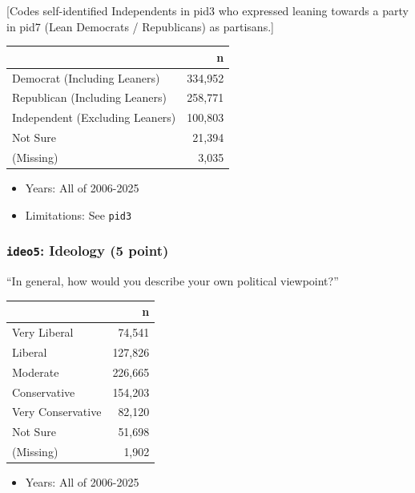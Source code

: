 \documentclass[10pt,article,oneside]{memoir}
\begin{document}
{[}Codes self-identified Independents in pid3 who expressed leaning
towards a party in pid7 (Lean Democrats / Republicans) as partisans.{]}

\begin{table}[H]
\centering
\begin{tabular}[t]{lr}
\toprule
 & n\\
\midrule
Democrat (Including Leaners) & 334,952\\
Republican (Including Leaners) & 258,771\\
Independent (Excluding Leaners) & 100,803\\
Not Sure & 21,394\\
(Missing) & 3,035\\
\bottomrule
\end{tabular}
\end{table}

\begin{itemize}
\tightlist
\item
  Years: All of 2006-2025
\item
  Limitations: See \texttt{pid3}
\end{itemize}

\subsubsection{\texorpdfstring{\texttt{ideo5}: Ideology (5
point)}{ideo5: Ideology (5 point)}}\label{ideo5-ideology-5-point}

``In general, how would you describe your own political viewpoint?''

\begin{table}[H]
\centering
\begin{tabular}[t]{lr}
\toprule
 & n\\
\midrule
Very Liberal & 74,541\\
Liberal & 127,826\\
Moderate & 226,665\\
Conservative & 154,203\\
Very Conservative & 82,120\\
Not Sure & 51,698\\
(Missing) & 1,902\\
\bottomrule
\end{tabular}
\end{table}

\begin{itemize}
\tightlist
\item
  Years: All of 2006-2025
\end{itemize}
\end{document}
